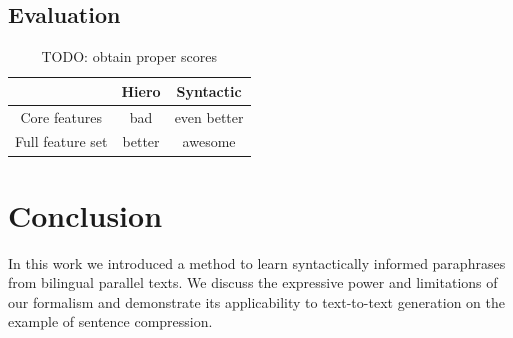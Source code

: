 \documentclass[11pt]{article}
\begin{document}
\subsection{Evaluation} \label{evaluation}

\begin{table}
\begin{center}
\begin{tabular}{|c|c|c|}
  \hline
  & Hiero & Syntactic \\
  \hline
  Core features & bad & even better \\
  Full feature set & better & awesome \\
  \hline
\end{tabular}
\end{center}
\caption{TODO: obtain proper scores}
\end{table}


\section{Conclusion} \label{conclusion}

In this work we introduced a method to learn syntactically informed
paraphrases from bilingual parallel texts. We discuss the expressive
power and limitations of our formalism and demonstrate its
applicability to text-to-text generation on the example of sentence
compression.




\nocite{*}
\end{document}
